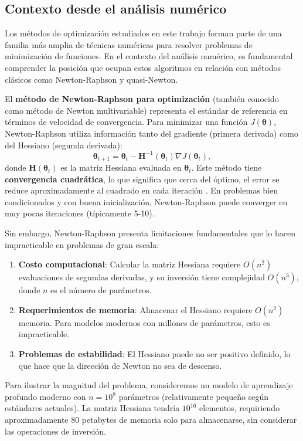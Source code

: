 \documentclass[12pt, spanish]{article}
\begin{document}
\subsection{Contexto desde el análisis numérico}
Los métodos de optimización estudiados en este trabajo forman parte de una familia más amplia de técnicas numéricas para resolver problemas de minimización de funciones. En el contexto del análisis numérico, es fundamental comprender la posición que ocupan estos algoritmos en relación con métodos clásicos como Newton-Raphson y quasi-Newton.

El \textbf{método de Newton-Raphson para optimización} (también conocido como método de Newton multivariable) representa el estándar de referencia en términos de velocidad de convergencia. Para minimizar una función $J(\boldsymbol{\theta})$, Newton-Raphson utiliza información tanto del gradiente (primera derivada) como del Hessiano (segunda derivada):
\[
\boldsymbol{\theta}_{t+1} = \boldsymbol{\theta}_t - \mathbf{H}^{-1}(\boldsymbol{\theta}_t) \nabla J(\boldsymbol{\theta}_t),
\]
donde $\mathbf{H}(\boldsymbol{\theta}_t)$ es la matriz Hessiana evaluada en $\boldsymbol{\theta}_t$. Este método tiene \textbf{convergencia cuadrática}, lo que significa que cerca del óptimo, el error se reduce aproximadamente al cuadrado en cada iteración \cite{ref12}. En problemas bien condicionados y con buena inicialización, Newton-Raphson puede converger en muy pocas iteraciones (típicamente 5-10).

Sin embargo, Newton-Raphson presenta limitaciones fundamentales que lo hacen impracticable en problemas de gran escala:

\begin{enumerate}
\item \textbf{Costo computacional}: Calcular la matriz Hessiana requiere $O(n^2)$ evaluaciones de segundas derivadas, y su inversión tiene complejidad $O(n^3)$, donde $n$ es el número de parámetros.
\item \textbf{Requerimientos de memoria}: Almacenar el Hessiano requiere $O(n^2)$ memoria. Para modelos modernos con millones de parámetros, esto es impracticable.
\item \textbf{Problemas de estabilidad}: El Hessiano puede no ser positivo definido, lo que hace que la dirección de Newton no sea de descenso.
\end{enumerate}

Para ilustrar la magnitud del problema, consideremos un modelo de aprendizaje profundo moderno con $n = 10^8$ parámetros (relativamente pequeño según estándares actuales). La matriz Hessiana tendría $10^{16}$ elementos, requiriendo aproximadamente 80 petabytes de memoria solo para almacenarse, sin considerar las operaciones de inversión.
\end{document}
